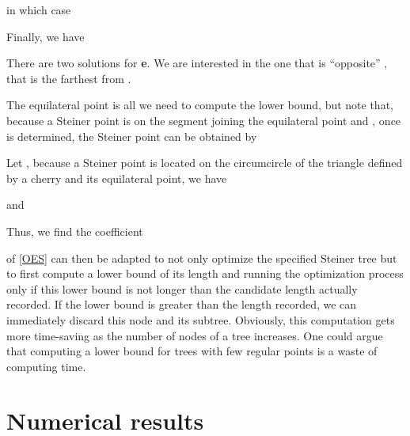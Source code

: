 \documentclass{article}
\theoremstyle{plain}
\begin{document}
in which case

Finally, we have

There are two solutions for \textbf{e}. 
We are interested in the one that is ``opposite'' , that is the  farthest from . 

The equilateral point is all we need to compute the lower bound, but note that, 
because a Steiner point is on the segment joining the equilateral point and 
,  once  is determined, the Steiner point  can be obtained by

Let , 
because a Steiner point is located on the circumcircle of the triangle defined by a cherry and its equilateral point, we have 

and

Thus, we find the coefficient


 of \cref{OES} can then be adapted to not only optimize the specified Steiner tree but to first compute a lower bound of its length and running the optimization process only if this lower bound is not longer than the candidate length actually recorded. 
If the lower bound is greater than the length recorded, we can immediately discard this node and its subtree. 
Obviously, this computation gets more time-saving as the number of nodes of a tree increases. 
One could argue that computing a lower bound for trees with few regular points is a waste of computing time.











\FloatBarrier


\section{Numerical results}
\label{sec:results}
\end{document}
